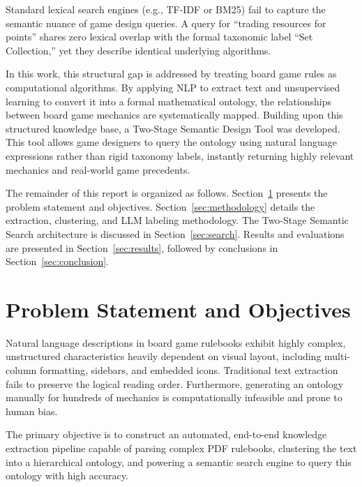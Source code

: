 \documentclass{article}
\begin{document}
Standard lexical search engines (e.g., TF-IDF or BM25) fail to capture the semantic nuance of game design queries. A query for ``trading resources for points'' shares zero lexical overlap with the formal taxonomic label ``Set Collection,'' yet they describe identical underlying algorithms.

In this work, this structural gap is addressed by treating board game rules as computational algorithms. By applying NLP to extract text and unsupervised learning to convert it into a formal mathematical ontology, the relationships between board game mechanics are systematically mapped. Building upon this structured knowledge base, a Two-Stage Semantic Design Tool was developed. This tool allows game designers to query the ontology using natural language expressions rather than rigid taxonomy labels, instantly returning highly relevant mechanics and real-world game precedents.
 
The remainder of this report is organized as follows. Section~\ref{sec:problem} presents the problem statement and objectives. Section~\ref{sec:methodology} details the extraction, clustering, and LLM labeling methodology. The Two-Stage Semantic Search architecture is discussed in Section~\ref{sec:search}. Results and evaluations are presented in Section~\ref{sec:results}, followed by conclusions in Section~\ref{sec:conclusion}.

\section{Problem Statement and Objectives}
\label{sec:problem}

Natural language descriptions in board game rulebooks exhibit highly complex, unstructured characteristics heavily dependent on visual layout, including multi-column formatting, sidebars, and embedded icons. Traditional text extraction fails to preserve the logical reading order. Furthermore, generating an ontology manually for hundreds of mechanics is computationally infeasible and prone to human bias.

The primary objective is to construct an automated, end-to-end knowledge extraction pipeline capable of parsing complex PDF rulebooks, clustering the text into a hierarchical ontology, and powering a semantic search engine to query this ontology with high accuracy.
\end{document}
